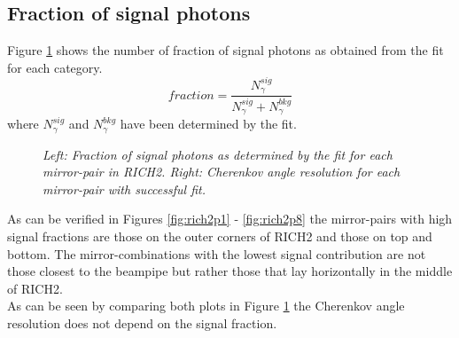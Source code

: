 \subsection{Fraction of signal photons}
Figure \ref{fig:rich2sigfrac} shows the number of fraction of signal photons as obtained from the fit for each category.
\begin{equation}
fraction = \frac{N^{sig}_{\gamma}}{N^{sig}_{\gamma} + N^{bkg}_{\gamma}}
\end{equation}
where $N^{sig}_{\gamma}$ and $N^{bkg}_{\gamma}$ have been determined by the fit.\\
\begin{figure}[!h]
	\vspace*{-0.cm}
	\begin{center}
		\vspace*{-0.5cm}
	\end{center}
	\caption{\textit{Left: Fraction of signal photons as determined by the fit for each mirror-pair in RICH2. Right: Cherenkov angle resolution for each mirror-pair with successful fit.}}
	\label{fig:rich2sigfrac}
\end{figure}
As can be verified in Figures \ref{fig:rich2p1} - \ref{fig:rich2p8} the mirror-pairs with high signal fractions are those on the outer corners of RICH2 and those on top and bottom. The mirror-combinations with the lowest signal contribution are not those closest to the beampipe but rather those that lay horizontally in the middle of RICH2.\\
As can be seen by comparing both plots in Figure \ref{fig:rich2sigfrac} the Cherenkov angle resolution does not depend on the signal fraction.\\

